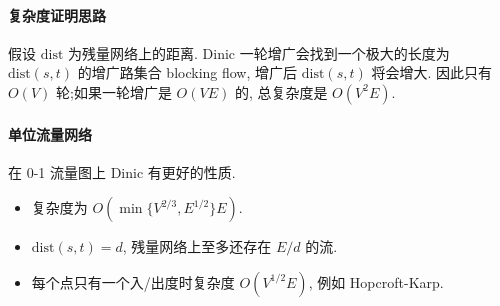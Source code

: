 \begin{small}
\paragraph{复杂度证明思路}
假设 $\mathrm{dist}$ 为残量网络上的距离.
Dinic 一轮增广会找到一个极大的长度为 $\mathrm{dist} (s, t)$ 的增广路集合 blocking flow, 增广后 $\mathrm{dist} (s, t)$ 将会增大.
因此只有 $O(V)$ 轮;如果一轮增广是 $O(VE)$ 的,
总复杂度是 $O(V^2E)$.

\paragraph{单位流量网络}
在 0-1 流量图上 Dinic 有更好的性质. 
\begin{itemize}
	\setlength{\itemsep}{0pt}
	\setlength{\parskip}{0pt}
	\setlength{\parsep}{0pt}
	\item 复杂度为 $O(\min \{V ^ {2/3}, E ^ {1/2}\} E)$.
	\item $\mathrm{dist} (s, t) = d$, 残量网络上至多还存在 $E/d$ 的流.
	\item 每个点只有一个入/出度时复杂度 $O(V ^ {1 /2 } E)$, 例如 Hopcroft-Karp.
\end{itemize}
\end{small}